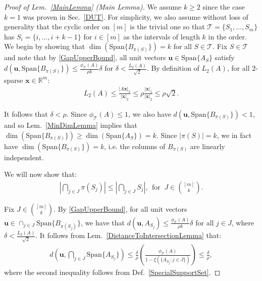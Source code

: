 \documentclass[journal, twocolumn]{IEEEtran}
\begin{document}
\begin{proof}[Proof of Lem.~\ref{MainLemma} (Main Lemma)]
We assume $k \geq 2$ since the case $k = 1$ was proven in Sec.~\ref{DUT}. For simplicity, we also assume without loss of generality that the cyclic order on $[m]$ is the trivial one so that $\mathcal{T} = \{S_1, \ldots, S_m\}$ has $S_i = \{i, \ldots, i+k-1\}$ for $i \in [m]$ as the intervals of length $k$ in the order. We begin by showing that $\dim(\text{Span}\{B_{\pi(S)}\}) = k$ for all $S \in \mathcal{T}$. 
Fix $S \in \mathcal{T}$ and note that by \eqref{GapUpperBound}, all unit vectors $\mathbf{u} \in \text{Span}\{A_{S}\}$ satisfy $d(\mathbf{u}, \text{Span}\{B_{\pi(S)}\}) \leq \frac{\phi_\mathcal{T}(A)}{\rho k} \delta$ for $\delta < \frac{L_2(A)}{ \sqrt{2}}$. By definition of $L_2(A)$, for all $2$-sparse $\mathbf{x} \in \mathbb{R}^m$:
\begin{align*}
L_2(A) \leq \frac{|A\mathbf{x}|_2}{|\mathbf{x}|_2} \leq \rho \frac{|\mathbf{x}|_1}{|\mathbf{x}|_2} \leq \rho \sqrt{2}.
\end{align*}

It follows that $\delta < \rho$. Since $\phi_\mathcal{T}(A) \leq 1$, we also have $d(\mathbf{u}, \text{Span}\{B_{\pi(S)}\}) < 1$, and so Lem.~\ref{MinDimLemma} implies that $\dim(\text{Span}\{B_{\pi(S)}\}) \geq \dim(\text{Span}\{A_{S}\}) = k$. Since $|\pi(S)| = k$, we in fact have $\dim(\text{Span}\{B_{\pi(S)}\}) = k$, i.e. the columns of $B_{\pi(S)}$ are linearly independent. %

We will now show that:
\begin{align}\label{fact2}
|\bigcap_{j \in J} \pi(S_j)| \leq |\bigcap_{j \in J} S_j |, \ \ \text{for } \ J \in {[m] \choose k}.
\end{align}

Fix $J \in {[m] \choose k}$. By \eqref{GapUpperBound}, for all unit vectors \mbox{$\mathbf{u} \in \cap_{j \in J} \text{Span}\{B_{\pi(S_j)}\}$}, we have  that $d(\mathbf{u}, A_{S_j}) \leq \frac{\phi_\mathcal{T}(A)}{\rho k} \delta$ for all $j \in J$, where $\delta < \frac{L_2(A)}{\sqrt{2}}$. It follows from Lem.~\ref{DistanceToIntersectionLemma} that:
\begin{align*}
d\left( \mathbf{u}, \bigcap_{j \in J} \text{Span}\{A_{S_j}\} \right) 
\leq \frac{\delta}{\rho} \left( \frac{ \phi_\mathcal{T}(A) }{1 - \xi( \{ A_{S_j}: j \in J\} ) } \right) \leq \frac{\delta}{\rho},
\end{align*}
%
where the second inequality follows from Def.~\ref{SpecialSupportSet}. %


\end{proof}
\end{document}
